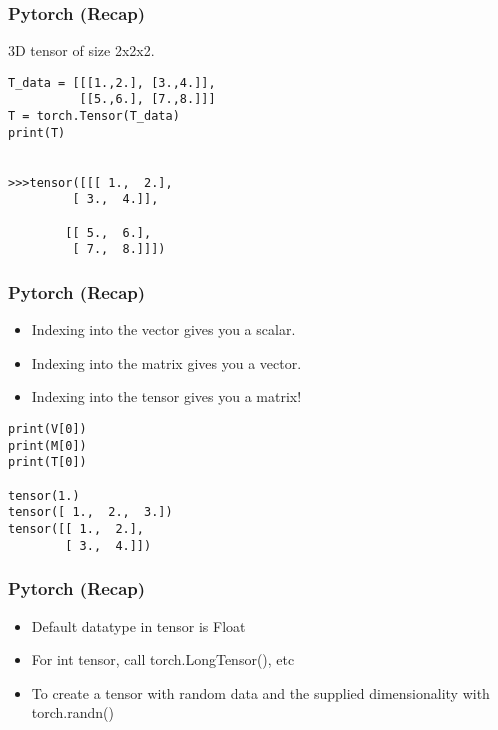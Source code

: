  
\begin{frame}[fragile]
\frametitle{Pytorch (Recap)}
3D tensor of size 2x2x2.
 \begin{lstlisting}
T_data = [[[1.,2.], [3.,4.]],
          [[5.,6.], [7.,8.]]]
T = torch.Tensor(T_data)
print(T)


>>>tensor([[[ 1.,  2.],
         [ 3.,  4.]],

        [[ 5.,  6.],
         [ 7.,  8.]]])
 \end{lstlisting}

 \end{frame} 

\begin{frame}[fragile]
\frametitle{Pytorch (Recap)}
\begin{itemize}
\item Indexing into the vector gives you a scalar. 
\item Indexing into the matrix gives you a vector. 
\item Indexing into the tensor gives you a matrix!
\end{itemize}

 \begin{lstlisting}
print(V[0])
print(M[0])
print(T[0])

tensor(1.)
tensor([ 1.,  2.,  3.])
tensor([[ 1.,  2.],
        [ 3.,  4.]])
 \end{lstlisting}

 \end{frame} 
 
 
\begin{frame}[fragile]
\frametitle{Pytorch (Recap)}
\begin{itemize}
\item Default datatype in tensor is Float
\item For int tensor, call torch.LongTensor(), etc
\item To create a tensor with random data and the supplied dimensionality with torch.randn()
\end{itemize}

 \end{frame} 
 
